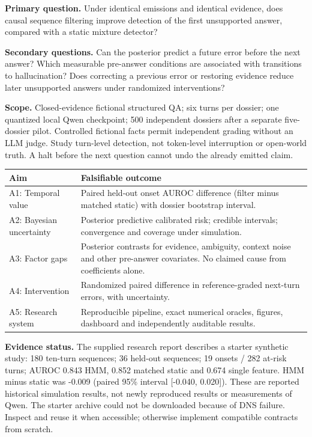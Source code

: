 \documentclass[11pt,letterpaper]{article}
\begin{document}
\textbf{Primary question.} Under identical emissions and identical evidence, does causal sequence filtering improve detection of the first unsupported answer, compared with a static mixture detector?

\textbf{Secondary questions.} Can the posterior predict a future error before the next answer? Which measurable pre-answer conditions are associated with transitions to hallucination? Does correcting a previous error or restoring evidence reduce later unsupported answers under randomized interventions?

\textbf{Scope.} Closed-evidence fictional structured QA; six turns per dossier; one quantized local Qwen checkpoint; 500 independent dossiers after a separate five-dossier pilot. Controlled fictional facts permit independent grading without an LLM judge. Study turn-level detection, not token-level interruption or open-world truth. A halt before the next question cannot undo the already emitted claim.


\begin{tabularx}{\linewidth}{p{.25\linewidth}X}
\toprule Aim & Falsifiable outcome \\ \midrule
A1: Temporal value & Paired held-out onset AUROC difference (filter minus matched static) with dossier bootstrap interval. \\
A2: Bayesian uncertainty & Posterior predictive calibrated risk; credible intervals; convergence and coverage under simulation. \\
A3: Factor gaps & Posterior contrasts for evidence, ambiguity, context noise and other pre-answer covariates. No claimed cause from coefficients alone. \\
A4: Intervention & Randomized paired difference in reference-graded next-turn errors, with uncertainty. \\
A5: Research system & Reproducible pipeline, exact numerical oracles, figures, dashboard and independently auditable results. \\ \bottomrule
\end{tabularx}


\textbf{Evidence status.} The supplied research report describes a starter synthetic study: 180 ten-turn sequences; 36 held-out sequences; 19 onsets / 282 at-risk turns; AUROC 0.843 HMM, 0.852 matched static and 0.674 single feature. HMM minus static was -0.009 (paired 95\% interval [-0.040, 0.020]). These are reported historical simulation results, not newly reproduced results or measurements of Qwen. The starter archive could not be downloaded because of DNS failure. Inspect and reuse it when accessible; otherwise implement compatible contracts from scratch.
\end{document}
